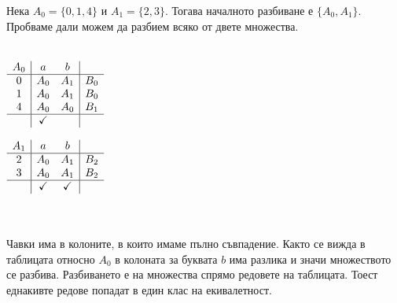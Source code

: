 \documentclass[12pt]{article}
\begin{document}
Нека \(A_0 = \{0, 1, 4\}\) и \(A_1 = \{2, 3\}\). Тогава началното разбиване е \(\{A_0, A_1\}\).
Пробваме дали можем да разбием всяко от двете множества.
\\
\vspace*{5mm}
\\
\begin{minipage}{.5\textwidth}
\centering
\(\begin{array}{c|cc|c}
A_0 & a & b   &     \\ \hline
0 & A_0 & A_1 & B_0 \\
1 & A_0 & A_1 & B_0 \\
4 & A_0 & A_0 & B_1 \\ \hline
  & \checkmark & & 
\end{array}\)
\end{minipage}
\begin{minipage}{.5\textwidth}
\centering
\(\begin{array}{c|cc|c}
A_1 & a & b   &     \\ \hline
2 & A_0 & A_1 & B_2 \\
3 & A_0 & A_1 & B_2 \\ \hline
  & \checkmark & \checkmark & 
\end{array}\)
\end{minipage}
\\
\vspace*{5mm}
\\
Чавки има в колоните, в които имаме пълно съвпадение. Както се вижда в таблицата относно \(A_0\) в колоната за буквата \(b\) има разлика и значи множеството се разбива. Разбиването е на множества спрямо редовете на таблицата. Тоест еднакивте редове попадат в един клас на екивалетност.
\vspace*{3mm}
\end{document}
